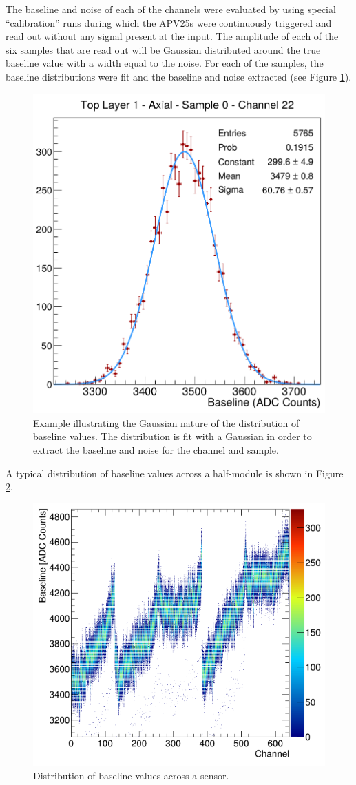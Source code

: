 The baseline and noise of each of the channels were evaluated by using 
special ``calibration'' runs during which the APV25s were continuously triggered
and read out without any signal present at the input.  The amplitude
of each of the six samples that are 
read out will be Gaussian distributed around the true baseline value with a 
width equal to the noise.  For each of the samples, the baseline distributions
were fit and the baseline and noise extracted (see Figure \ref{fig:baseline_fit}).
\begin{figure}[h!t]
    \centering
    \includegraphics[width=.6\textwidth]{images/baseline_fit_top_l1_axial_sample0_ch22.png}
    \caption{Example illustrating the Gaussian nature of the distribution of
             baseline values.  The distribution is fit with a Gaussian in order 
             to extract the baseline and noise for the channel and sample.}
    \label{fig:baseline_fit}
\end{figure}
A typical distribution of baseline values across a half-module is shown in 
Figure \ref{fig:baseline}.  
\begin{figure}[h!t] 
    \centering
    \includegraphics[width=.7\textwidth]{images/baseline.png}
    \caption{Distribution of baseline values across a sensor.}
    \label{fig:baseline}
\end{figure}  
